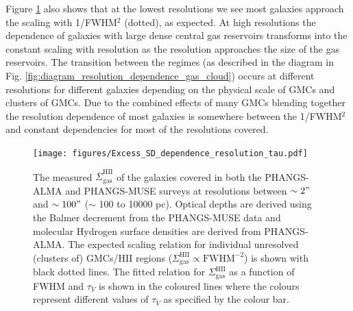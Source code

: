 \documentclass[fleqn,usenatbib]{mnras}
\begin{document}
Figure \ref{fig:Excess_SD_dependence_resolution_tau} also shows that at the lowest resolutions we see most galaxies approach the scaling with 1/FWHM$^2$ (dotted), as expected. At high resolutions the dependence of galaxies with large dense central gas reservoirs transforms into the constant scaling with resolution as the resolution approaches the size of the gas reservoirs. The transition between the regimes (as described in the diagram in Fig. \ref{fig:diagram_resolution_dependence_gas_cloud}) occurs at different resolutions for different galaxies depending on the physical scale of GMCs and clusters of GMCs. Due to the combined effects of many GMCs blending together the resolution dependence of most galaxies is somewhere between the 1/FWHM$^2$ and constant dependencies for most of the resolutions covered.

\begin{figure}
    \centering
    \texttt{[image: figures/Excess\_SD\_dependence\_resolution\_tau.pdf]}
    \caption{The measured $\overline{\Sigma}_{\textrm{gas}}^{\textrm{HII}}$ of the galaxies covered in both the PHANGS-ALMA and PHANGS-MUSE surveys at resolutions between $\sim2"$ and $\sim100"$ ($\sim$ 100 to 10000 pc). Optical depths are derived using the Balmer decrement from the PHANGS-MUSE data and molecular Hydrogen surface densities are derived from PHANGS-ALMA. The expected scaling relation for individual unresolved (clusters of) GMCs/HII regions ($\Sigma_{\textrm{gas}}^{\textrm{HII}} \propto \textrm{FWHM}^{-2}$) is shown with black dotted lines. The fitted relation for $\Sigma_{\textrm{gas}}^{\textrm{HII}}$ as a function of FWHM and $\tau_V$ is shown in the coloured lines where the colours represent different values of $\tau_V$ as specified by the colour bar.}
    \label{fig:Excess_SD_dependence_resolution_tau}
\end{figure}
\end{document}
